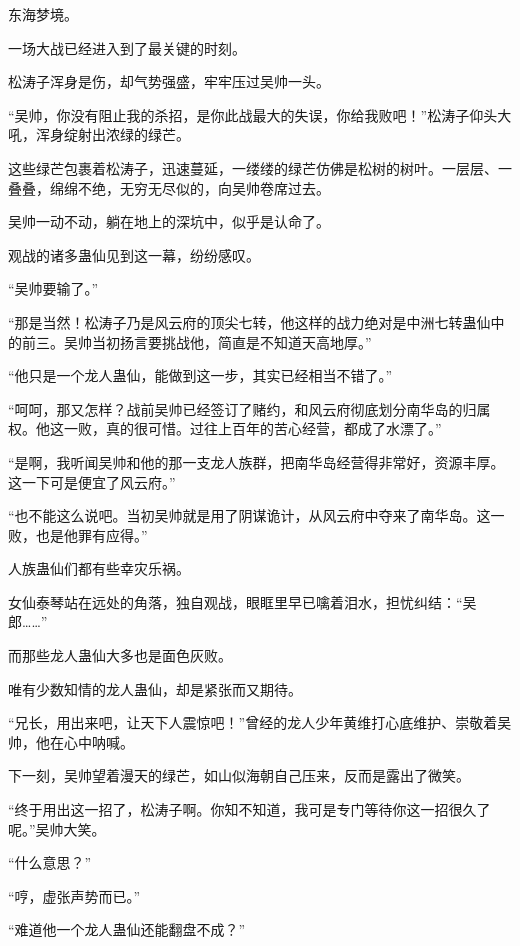 
\begin{this_body}



东海梦境。

一场大战已经进入到了最关键的时刻。

松涛子浑身是伤，却气势强盛，牢牢压过吴帅一头。

“吴帅，你没有阻止我的杀招，是你此战最大的失误，你给我败吧！”松涛子仰头大吼，浑身绽射出浓绿的绿芒。

这些绿芒包裹着松涛子，迅速蔓延，一缕缕的绿芒仿佛是松树的树叶。一层层、一叠叠，绵绵不绝，无穷无尽似的，向吴帅卷席过去。

吴帅一动不动，躺在地上的深坑中，似乎是认命了。

观战的诸多蛊仙见到这一幕，纷纷感叹。

“吴帅要输了。”

“那是当然！松涛子乃是风云府的顶尖七转，他这样的战力绝对是中洲七转蛊仙中的前三。吴帅当初扬言要挑战他，简直是不知道天高地厚。”

“他只是一个龙人蛊仙，能做到这一步，其实已经相当不错了。”

“呵呵，那又怎样？战前吴帅已经签订了赌约，和风云府彻底划分南华岛的归属权。他这一败，真的很可惜。过往上百年的苦心经营，都成了水漂了。”

“是啊，我听闻吴帅和他的那一支龙人族群，把南华岛经营得非常好，资源丰厚。这一下可是便宜了风云府。”

“也不能这么说吧。当初吴帅就是用了阴谋诡计，从风云府中夺来了南华岛。这一败，也是他罪有应得。”

人族蛊仙们都有些幸灾乐祸。

女仙泰琴站在远处的角落，独自观战，眼眶里早已噙着泪水，担忧纠结：“吴郎……”

而那些龙人蛊仙大多也是面色灰败。

唯有少数知情的龙人蛊仙，却是紧张而又期待。

“兄长，用出来吧，让天下人震惊吧！”曾经的龙人少年黄维打心底维护、崇敬着吴帅，他在心中呐喊。

下一刻，吴帅望着漫天的绿芒，如山似海朝自己压来，反而是露出了微笑。

“终于用出这一招了，松涛子啊。你知不知道，我可是专门等待你这一招很久了呢。”吴帅大笑。

“什么意思？”

“哼，虚张声势而已。”

“难道他一个龙人蛊仙还能翻盘不成？”


\end{this_body}
